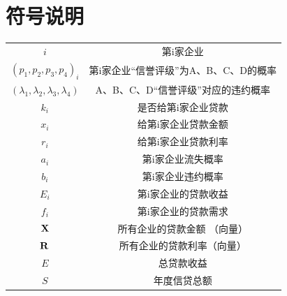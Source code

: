 \documentclass[bwprint]{cumcm}
\begin{document}

\newpage
\section{\heiti 符号说明}
\begin{tabular}{cc}
	\hline
	\makebox[0.4\textwidth][c]{符号及名词}	&  \makebox[0.5\textwidth][c]{意义} \\ \hline
	$i$	    & 第i家企业\\ \hline
	$(p_1,p_2,p_3,p_4)_i$	    & 第i家企业“信誉评级”为A、B、C、D的概率\\ \hline
	$(\lambda_1,\lambda_2,\lambda_3,\lambda_4)$ & A、B、C、D“信誉评级”对应的违约概率  \\ \hline
	$k_i$	    & 是否给第i家企业贷款  \\ \hline

	$x_i $    & 给第i家企业贷款金额 \\ \hline
	$r_i $	    &  给第i家企业贷款利率 \\ \hline
	$a_i $	    & 第i家企业流失概率  \\ \hline
	$b_i$         & 第i家企业违约概率  \\ \hline
	$E_i$         & 第i家企业的贷款收益  \\ \hline
	$f_i$         & 第i家企业的贷款需求  \\ \hline
	$\bold{X} $	    & 所有企业的贷款金额 （向量） \\ \hline
	$\bold{R} $         & 所有企业的贷款利率（向量） \\ \hline
	$E$         & 总贷款收益  \\ \hline
	$S$         & 年度信贷总额  \\ \hline
	
	
	\hline
\end{tabular}



\begin{center}
\end{center}
\end{document}
